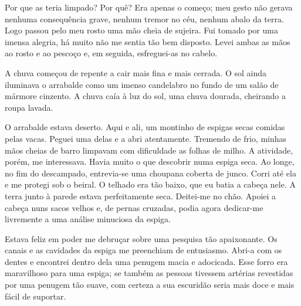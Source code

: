 
Por que as teria limpado? Por quê? Era apenas o começo; meu gesto não gerava
nenhuma consequência grave, nenhum tremor no céu, nenhum abalo da terra. Logo
passou pelo meu rosto uma mão cheia de sujeira. Fui tomado por uma imensa
alegria, há muito não me sentia tão bem disposto. Levei ambas as mãos ao
rosto e ao pescoço e, em seguida, esfreguei-as no cabelo. 

A chuva começou de repente a cair mais fina e mais cerrada. O sol ainda
iluminava o arrabalde como um imenso candelabro no fundo de um salão de
mármore cinzento. A chuva caía à luz do sol, uma chuva dourada, cheirando a
roupa lavada.

O arrabalde estava deserto. Aqui e ali, um montinho de espigas secas comidas
pelas vacas. Peguei uma delas e a abri atentamente. Tremendo de frio, minhas
mãos cheias de barro limpavam com dificuldade as folhas de milho. A
atividade, porém, me interessava. Havia muito o que descobrir numa espiga
seca. Ao longe, no fim do descampado, entrevia-se uma choupana coberta de
junco. Corri até ela e me protegi sob o beiral. O telhado era tão baixo, que
eu batia a cabeça nele. A terra junto à parede estava perfeitamente seca.
Deitei-me no chão. Apoiei a cabeça nuns sacos velhos e, de pernas cruzadas,
podia agora dedicar-me livremente a uma análise minuciosa da espiga.

Estava feliz em poder me debruçar sobre uma pesquisa tão apaixonante. Os
canais e as cavidades da espiga me preenchiam de entusiasmo. Abri-a com os
dentes e encontrei dentro dela uma penugem macia e adocicada. Esse forro era
maravilhoso para uma espiga; se também as pessoas tivessem artérias
revestidas por uma penugem tão suave, com certeza a sua escuridão seria mais
doce e mais fácil de suportar.




